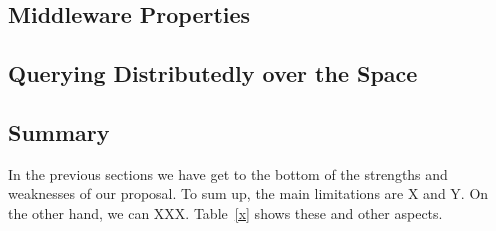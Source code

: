 




\subsection{Middleware Properties}




\subsection{Querying Distributedly over the Space}





\subsection{Summary}

In the previous sections we have get to the bottom of the strengths and weaknesses of our proposal.
To sum up, the main limitations are X and Y.
On the other hand, we can XXX.
Table~\ref{x} shows these and other aspects.


